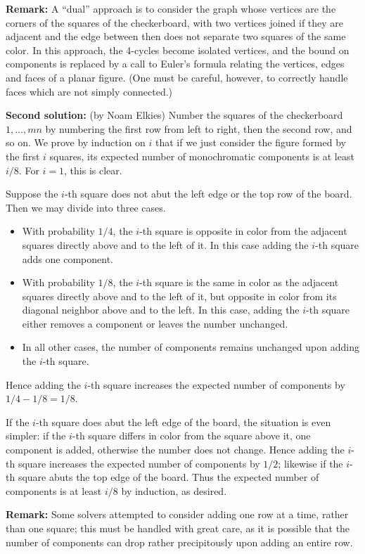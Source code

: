 \documentclass[amssymb,twocolumn,pra,10pt,aps]{revtex4-1}
\begin{document}
\begin{itemize}
\textbf{Remark:}
A ``dual'' approach is to consider
the graph whose vertices are the corners of the squares of the checkerboard,
with two vertices joined if they are adjacent and the edge between then
does not separate two squares of the same color. In this approach,
the 4-cycles become isolated vertices, and the bound on components
is replaced by a call to Euler's formula relating the vertices, edges
and faces of a planar figure. (One must be careful, however, to correctly
handle faces which are not simply connected.)

\textbf{Second solution:} (by Noam Elkies)
Number the squares of the checkerboard $1, \dots, mn$ by numbering the
first row from left to right, then the second row, and so on. We prove
by induction on $i$ that if we just consider the figure formed by the
first $i$ squares, its expected number of monochromatic components is
at least $i/8$. For $i=1$, this is clear.

Suppose the $i$-th square does not abut the left edge or the top row
of the board.
Then we may divide into three cases.
\begin{itemize}
\item
With probability $1/4$, the $i$-th square is opposite in color from
the adjacent squares directly above and to the left of it. In this case
adding the $i$-th square adds one component.
\item
With probability $1/8$, the $i$-th square is the same in color as the
adjacent squares directly above and to the left of it, but opposite in
color from its diagonal neighbor above and to the left. In this case,
adding the $i$-th square either removes a component or leaves the number
unchanged.
\item
In all other cases, the number of components remains unchanged upon
adding the $i$-th square.
\end{itemize}
Hence adding the $i$-th square increases the expected number of components
by $1/4 - 1/8 = 1/8$.

If the $i$-th square does abut the left edge of the board, the situation
is even simpler: if the $i$-th square differs in color from the square
above it, one component is added, otherwise the number does not change. Hence
adding the $i$-th square increases the expected number of components
by $1/2$; likewise if the $i$-th square abuts the top edge of the board.
Thus the expected number of components is at least $i/8$ by induction,
as desired.

\textbf{Remark:} Some solvers attempted to consider adding one row
at a time, rather than one square; this must be handled with great
care, as it is possible that the number of components can drop
rather precipitously upon adding an entire row.


\end{itemize}
\end{document}
